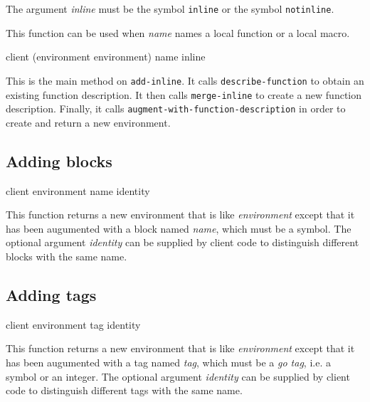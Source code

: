 The argument \textit{inline} must be the symbol \texttt{inline} or the
symbol \texttt{notinline}.

This function can be used when \textit{name} names a local function or
a local macro.

{\footnotesize
{}
{client
 (environment environment)
 name
 inline}
}

This is the main method on \texttt{add-inline}.  It calls
\texttt{describe-function} to obtain an existing function description.
It then calls \texttt{merge-inline} to create a new function
description.  Finally, it calls
\texttt{augment-with-function-description} in order to create and
return a new environment.

\subsection{Adding blocks}

{\footnotesize
{} {client environment name \optional identity}
}

This function returns a new environment that is like
\textit{environment} except that it has been augumented with a block
named \textit{name}, which must be a symbol.  The optional argument
\textit{identity} can be supplied by client code to distinguish
different blocks with the same name.

\subsection{Adding tags}

{\footnotesize
{} {client environment tag \optional identity}
}

This function returns a new environment that is like
\textit{environment} except that it has been augumented with a tag
named \textit{tag}, which must be a \emph{go tag}, i.e. a symbol or an
integer.  The optional argument \textit{identity} can be supplied by
client code to distinguish different tags with the same name.
